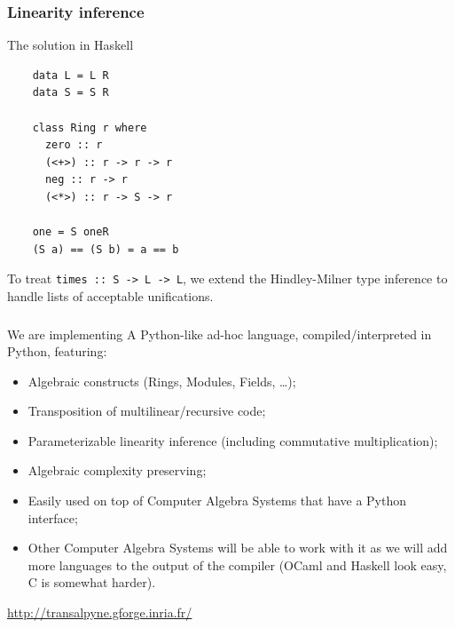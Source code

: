 \documentclass[10pt]{beamer}
\begin{document}
\begin{frame}[fragile]
  \frametitle{Linearity inference}
  
  \begin{center}
    The solution in Haskell
  \end{center}

  \begin{lstlisting}
    data L = L R
    data S = S R
    
    class Ring r where
      zero :: r
      (<+>) :: r -> r -> r
      neg :: r -> r
      (<*>) :: r -> S -> r

    one = S oneR
    (S a) == (S b) = a == b
  \end{lstlisting}

  \begin{center}
    To treat \alert{\lstinline{times :: S -> L -> L}}, we extend the
    Hindley-Milner type inference to handle lists of acceptable
    unifications.
  \end{center}
\end{frame}

{
\begin{frame}
  \frametitle{\tALpy{}}
  
  \begin{block}{We are implementing}
    A Python-like ad-hoc language, compiled/interpreted in Python,
    featuring:
    \begin{itemize}
    \item Algebraic constructs (Rings, Modules, Fields, \ldots);
    \item Transposition of multilinear/recursive code;
    \item Parameterizable linearity inference (including commutative
      multiplication);
    \item Algebraic complexity preserving;
    \item Easily used on top of Computer Algebra Systems that have a
      Python interface;
    \item Other Computer Algebra Systems will be able to work with it
      as we will add more languages to the output of the compiler
      (OCaml and Haskell look easy, C is somewhat harder).
    \end{itemize}
  \end{block}

  \begin{center}
    \url{http://transalpyne.gforge.inria.fr/}
  \end{center}
\end{frame}
}
\end{document}
